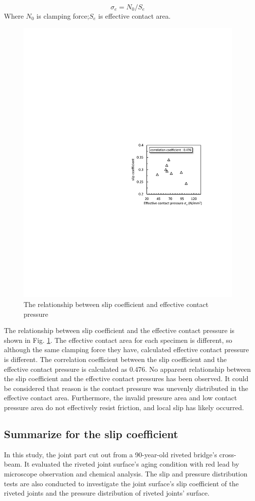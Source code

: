\begin{equation}
    σ_e=N_0/S_e
\end{equation}
Where $N_0$ is clamping force;$ S_e$ is effective contact area. 

\begin{figure}
\centering
\includegraphics[width=0.65\linewidth]{imgs/ch3/fig14.pdf}
\caption{The relationship between slip coefficient and effective contact pressure}
\label{ch3fig14}  
\end{figure}

The relationship between slip coefficient and the effective contact pressure is shown in Fig. \ref{ch3fig14}. The effective contact area for each specimen is different, so although the same clamping force they have, calculated effective contact pressure is different. The correlation coefficient between the slip coefficient and the effective contact pressure is calculated as 0.476. No apparent relationship between the slip coefficient and the effective contact pressures has been observed. It could be considered that reason is the contact pressure was unevenly distributed in the effective contact area. Furthermore, the invalid pressure area and low contact pressure area do not effectively resist friction, and local slip has likely occurred. 


\subsection{Summarize for the slip coefficient}
In this study, the joint part cut out from a 90-year-old riveted bridge's cross-beam. It evaluated the riveted joint surface's aging condition with red lead by microscope observation and chemical analysis. The slip and pressure distribution tests are also conducted to investigate the joint surface's slip coefficient of the riveted joints and the pressure distribution of riveted joints' surface. 

